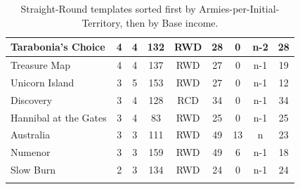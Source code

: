 \begin{longtable}{|l|c|c|c|c|c|c|c|c|}
Tarabonia's Choice        & 4 & 4 & 132 & RWD & 28 & 0 & n-2 & 28 \\ \hline
Treasure Map              & 4 & 4 & 137 & RWD & 27 & 0 & n-1 & 19 \\ \hline\hline\hline
Unicorn Island            & 3 & 5 & 153 & RWD & 27 & 0 & n-1 & 12 \\ \hline
Discovery                 & 3 & 4 & 128 & RCD & 34 & 0 & n-1 & 34 \\ \hline
Hannibal at the Gates     & 3 & 4 &  83 & RWD & 25 & 0 & n-1 & 25 \\ \hline
Australia                 & 3 & 3 & 111 & RWD & 49 & 13 & n   & 23 \\ \hline
Numenor                   & 3 & 3 & 159 & RWD & 49 & 6 & n-1 & 18 \\ \hline\hline\hline
Slow Burn                 & 2 & 3 & 134 & RWD & 24 & 0 & n-1 & 24 \\ \hline
\caption{Straight-Round templates sorted first by Armies-per-Initial-Territory, then by Base income.}
\label{table:sr_bonus_sorted}
\end{longtable}
\normalsize

